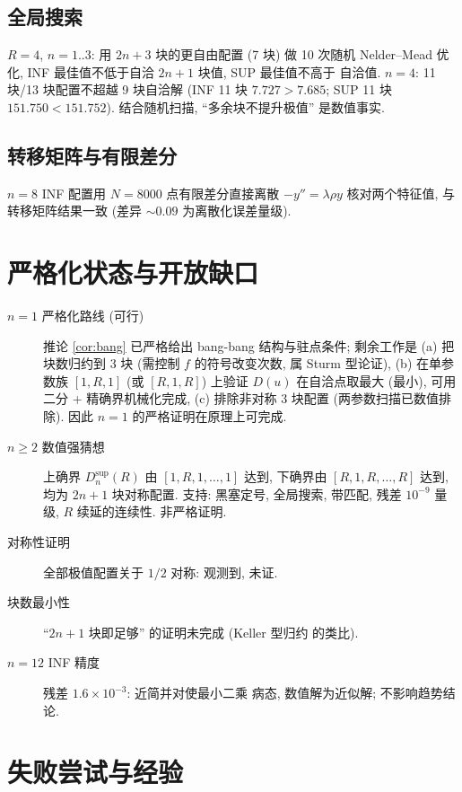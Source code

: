 \documentclass[UTF8]{ctexart}
\begin{document}
\subsection{全局搜索}

$R=4$, $n=1..3$: 用 $2n+3$ 块的更自由配置 (7 块) 做 10 次随机
Nelder--Mead 优化, INF 最佳值不低于自洽 $2n+1$ 块值, SUP 最佳值不高于
自洽值. $n=4$: 11 块/13 块配置不超越 9 块自洽解 (INF 11 块
$7.727 > 7.685$; SUP 11 块 $151.750 < 151.752$). 结合随机扫描,
``多余块不提升极值'' 是数值事实.

\subsection{转移矩阵与有限差分}

$n=8$ INF 配置用 $N = 8000$ 点有限差分直接离散 $-y'' = \lambda\rho y$
核对两个特征值, 与转移矩阵结果一致 (差异 $\sim 0.09$ 为离散化误差量级).

\section{严格化状态与开放缺口}\label{sec:open}

\begin{description}
	\item[$n = 1$ 严格化路线 (可行)] 推论 \ref{cor:bang} 已严格给出
		bang-bang 结构与驻点条件; 剩余工作是 (a) 把块数归约到 3 块
		(需控制 $f$ 的符号改变次数, 属 Sturm 型论证), (b) 在单参数族
		$[1,R,1]$ (或 $[R,1,R]$) 上验证 $D(u)$ 在自洽点取最大 (最小),
		可用二分 + 精确界机械化完成, (c) 排除非对称 3 块配置
		(两参数扫描已数值排除). 因此 $n=1$ 的严格证明在原理上可完成.
	\item[$n \geq 2$ 数值强猜想] 上确界 $D_n^{\mathrm{sup}}(R)$ 由
		$[1,R,1,\dots,1]$ 达到, 下确界由 $[R,1,R,\dots,R]$ 达到,
		均为 $2n+1$ 块对称配置. 支持: 黑塞定号, 全局搜索, 带匹配,
		残差 $10^{-9}$ 量级, $R$ 续延的连续性. 非严格证明.
	\item[对称性证明] 全部极值配置关于 $1/2$ 对称: 观测到, 未证.
	\item[块数最小性] ``$2n+1$ 块即足够'' 的证明未完成 (Keller 型归约
		的类比).
	\item[$n=12$ INF 精度] 残差 $1.6\times10^{-3}$: 近简并对使最小二乘
		病态, 数值解为近似解; 不影响趋势结论.
\end{description}

\section{失败尝试与经验}\label{sec:fail}
\end{document}
